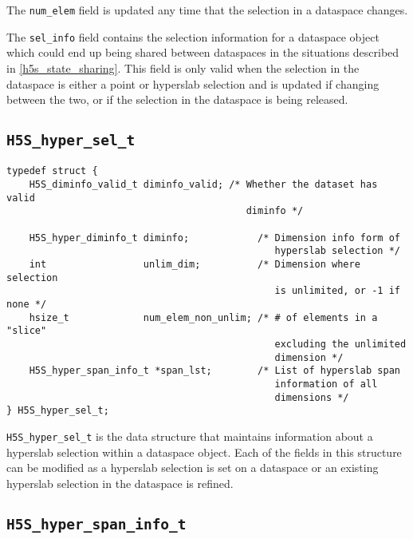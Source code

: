 \documentclass[../HDF5_RFC.tex]{subfiles}
\begin{document}
The \texttt{num\_elem} field is updated any time that the selection in a dataspace
changes.

The \texttt{sel\_info} field contains the selection information for a dataspace
object which could end up being shared between dataspaces in the situations described
in \ref{h5s_state_sharing}. This field is only valid when the selection in the dataspace
is either a point or hyperslab selection and is updated if changing between the two,
or if the selection in the dataspace is being released.

\subsection{\texttt{H5S\_hyper\_sel\_t}}
\label{apdx:h5s_struct_h5s_hyper_sel_t}

\begin{verbatim}
typedef struct {
    H5S_diminfo_valid_t diminfo_valid; /* Whether the dataset has valid
                                          diminfo */

    H5S_hyper_diminfo_t diminfo;            /* Dimension info form of
                                               hyperslab selection */
    int                 unlim_dim;          /* Dimension where selection
                                               is unlimited, or -1 if none */
    hsize_t             num_elem_non_unlim; /* # of elements in a "slice"
                                               excluding the unlimited
                                               dimension */
    H5S_hyper_span_info_t *span_lst;        /* List of hyperslab span
                                               information of all
                                               dimensions */
} H5S_hyper_sel_t;
\end{verbatim}

\texttt{H5S\_hyper\_sel\_t} is the data structure that maintains information about a
hyperslab selection within a dataspace object. Each of the fields in this structure
can be modified as a hyperslab selection is set on a dataspace or an existing hyperslab
selection in the dataspace is refined.

\subsection{\texttt{H5S\_hyper\_span\_info\_t}}
\label{apdx:h5s_struct_h5s_hyper_span_info_t}
\end{document}
